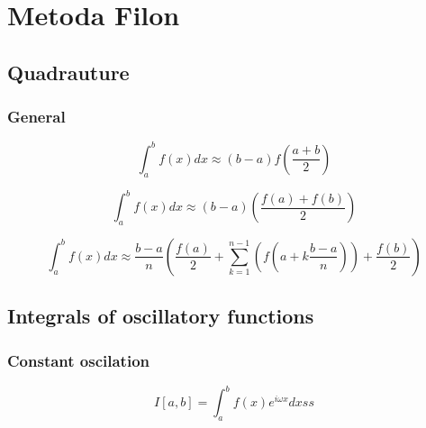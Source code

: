 \chapter{Metoda Filon}
\label{cap:cap2}

\section{Quadrauture}
\subsection{General}

\begin{equation}
    \int_a^b f(x) dx \approx (b-a) f\left(\frac{a+b}{2}\right)
\end{equation}


\begin{equation}
    \int_a^b f(x) dx \approx (b-a) \left(\frac{f(a)+f(b)}{2}\right)
\end{equation}

\begin{equation}
    \int_a^b f(x) dx \approx \frac{b-a}{n}\left(\frac{f(a)}{2}+\sum_{k=1}^{n-1}\left(f\left(a+k\frac{b-a}{n}\right)\right)+\frac{f(b)}{2}\right)
\end{equation}

\section{Integrals of oscillatory functions}

\subsection{Constant oscilation}

\begin{equation}
    I[a,b] = \int_a^b f(x)e^{i\omega x}dx ss
\end{equation}





